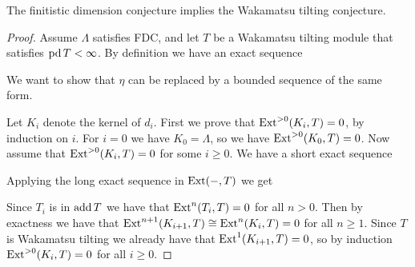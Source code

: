 \begin{theorem} \cite[Proposition~4.4]{MR04}
	The finitistic dimension conjecture implies the Wakamatsu tilting conjecture.
	\begin{proof}
		Assume $\Lambda$ satisfies FDC, and let $T$ be a Wakamatsu tilting module that satisfies $\operatorname{pd} T < \infty$. By definition we have an exact sequence
		\begin{center}
		\end{center}
		We want to show that $\eta$ can be replaced by a bounded sequence of the same form. 
		
		Let $K_i$ denote the kernel of $d_i$. First we prove that $\operatorname{Ext}^{>0}(K_i, T)=0$, by induction on $i$. For $i=0$ we have $K_0=\Lambda$, so we have $\operatorname{Ext}^{>0}(K_0, T)=0$. Now assume that $\operatorname{Ext}^{>0}(K_i, T)=0$ for some $i \geq 0$. We have a short exact sequence
		\begin{center}
		\end{center}
		Applying the long exact sequence in $\operatorname{Ext}(-, T)$ we get
		\begin{center}
		\end{center}
		Since $T_{i}$ is in $\operatorname{add} T$ we have that $\operatorname{Ext}^n(T_{i}, T)=0$ for all $n>0$. Then by exactness we have that $\operatorname{Ext}^{n+1}(K_{i+1}, T) \cong \operatorname{Ext}^{n}(K_i, T) = 0$ for all $n \geq 1$. Since $T$ is Wakamatsu tilting we already have that $\operatorname{Ext}^1(K_{i+1}, T) = 0$, so by induction $\operatorname{Ext}^{>0}(K_i, T)=0$ for all $i\geq 0$.
		

\end{proof}
\end{theorem}
